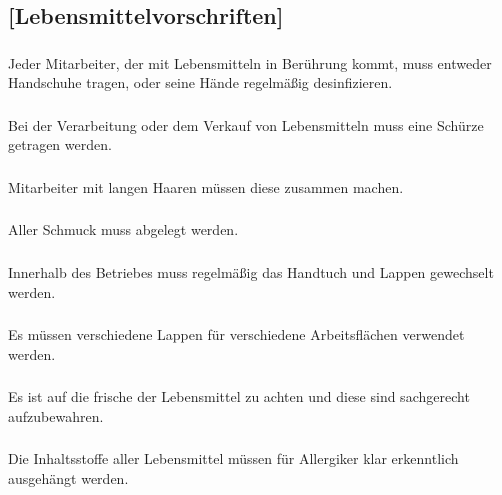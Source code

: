 \documentclass[a4paper, 11pt]{report}
\let\oldsubsection\subsection
\renewcommand{\subsection}{\leftskip=40pt\oldsubsection}
\begin{document}
\subsection{[Lebensmittelvorschriften]}

 
\subsubsection{}
Jeder Mitarbeiter, der mit Lebensmitteln in Berührung kommt, muss entweder Handschuhe tragen, oder seine Hände regelmäßig desinfizieren. 

\subsubsection{}
Bei der Verarbeitung oder dem Verkauf von Lebensmitteln muss eine Schürze getragen werden. 

\subsubsection{}
Mitarbeiter mit langen Haaren müssen diese zusammen machen. 

\subsubsection{}
Aller Schmuck muss abgelegt werden. 

\subsubsection{}
Innerhalb des Betriebes muss regelmäßig das Handtuch und Lappen gewechselt werden. 

\subsubsection{}
Es müssen verschiedene Lappen für verschiedene Arbeitsflächen verwendet werden. 

\subsubsection{}
Es ist auf die frische der Lebensmittel zu achten und diese sind sachgerecht aufzubewahren.

\subsubsection{}
Die Inhaltsstoffe aller Lebensmittel müssen für Allergiker klar erkenntlich ausgehängt werden.
\end{document}
